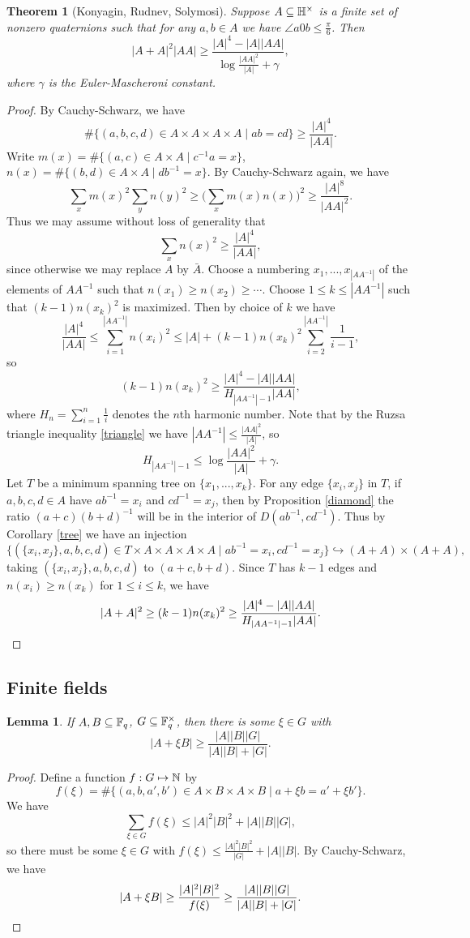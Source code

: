 \documentclass[letterpaper,11pt]{article}
\newtheorem{thm}{Theorem}
\newtheorem{lem}{Lemma}
\theoremstyle{definition}
\theoremstyle{remark}
\begin{document}
\begin{thm}[Konyagin, Rudnev, Solymosi] Suppose $A \subseteq\mathbb{H}^\times$ is a finite set of nonzero quaternions such that for any $a,b \in A$ we have $\angle a0b \le \frac{\pi}{6}$. Then
\[
|A+A|^2|AA| \ge \frac{|A|^4-|A||AA|}{\log\frac{|AA|^2}{|A|}+\gamma},
\]
where $\gamma$ is the Euler-Mascheroni constant.
\end{thm}
\begin{proof} By Cauchy-Schwarz, we have
\[
\#\{(a,b,c,d)\in A\times A\times A\times A\mid ab = cd\} \ge \frac{|A|^4}{|AA|}.
\]
Write $m(x) = \#\{(a,c) \in A\times A\mid c^{-1}a = x\}$, $n(x) = \#\{(b,d) \in A\times A\mid db^{-1} = x\}$. By Cauchy-Schwarz again, we have
\[
\sum_x m(x)^2\sum_y n(y)^2 \ge \Big(\sum_x m(x)n(x)\Big)^2 \ge \frac{|A|^8}{|AA|^2}.
\]
Thus we may assume without loss of generality that
\[
\sum_x n(x)^2 \ge \frac{|A|^4}{|AA|},
\]
since otherwise we may replace $A$ by $\bar{A}$. Choose a numbering $x_1, ..., x_{|AA^{-1}|}$ of the elements of $AA^{-1}$ such that $n(x_1) \ge n(x_2) \ge \cdots$. Choose $1 \le k \le |AA^{-1}|$ such that $(k-1)n(x_k)^2$ is maximized. Then by choice of $k$ we have
\[
\frac{|A|^4}{|AA|} \le \sum_{i=1}^{|AA^{-1}|} n(x_i)^2 \le |A| + (k-1)n(x_k)^2\sum_{i=2}^{|AA^{-1}|} \frac{1}{i-1},
\]
so
\[
(k-1)n(x_k)^2 \ge \frac{|A|^4-|A||AA|}{H_{|AA^{-1}|-1}|AA|},
\]
where $H_n = \sum_{i=1}^n \frac{1}{i}$ denotes the $n$th harmonic number. Note that by the Ruzsa triangle inequality \ref{triangle} we have $|AA^{-1}| \le \frac{|AA|^2}{|A|}$, so
\[
H_{|AA^{-1}|-1} \le \log\frac{|AA|^2}{|A|}+\gamma.
\]
Let $T$ be a minimum spanning tree on $\{x_1, ..., x_k\}$. For any edge $\{x_i,x_j\}$ in $T$, if $a,b,c,d \in A$ have $ab^{-1} = x_i$ and $cd^{-1} = x_j$, then by Proposition \ref{diamond} the ratio $(a+c)(b+d)^{-1}$ will be in the interior of $D(ab^{-1},cd^{-1})$. Thus by Corollary \ref{tree} we have an injection
\[
\{(\{x_i,x_j\},a,b,c,d)\in T\times A\times A\times A\times A\mid ab^{-1}=x_i, cd^{-1}=x_j\} \hookrightarrow (A+A)\times (A+A),
\]
taking $(\{x_i,x_j\},a,b,c,d)$ to $(a+c,b+d)$. Since $T$ has $k-1$ edges and $n(x_i) \ge n(x_k)$ for $1 \le i \le k$, we have
\[
|A+A|^2 \ge (k-1)n(x_k)^2 \ge \frac{|A|^4-|A||AA|}{H_{|AA^{-1}|-1}|AA|}.\qedhere
\]
\end{proof}

\subsection{Finite fields}

\begin{lem}\label{xi} If $A,B \subseteq \mathbb{F}_q$, $G \subseteq \mathbb{F}_q^\times$, then there is some $\xi \in G$ with
\[
|A+\xi B| \ge \frac{|A||B||G|}{|A||B|+|G|}.
\]
\end{lem}
\begin{proof} Define a function $f:G\mapsto \mathbb{N}$ by
\[
f(\xi) = \#\{(a,b,a',b')\in A\times B\times A\times B\mid a+\xi b = a'+\xi b'\}.
\]
We have
\[
\sum_{\xi \in G} f(\xi) \le |A|^2|B|^2 + |A||B||G|,
\]
so there must be some $\xi \in G$ with $f(\xi) \le \frac{|A|^2|B|^2}{|G|} + |A||B|$. By Cauchy-Schwarz, we have
\[
|A+\xi B| \ge \frac{|A|^2|B|^2}{f(\xi)} \ge \frac{|A||B||G|}{|A||B|+|G|}.\qedhere
\]
\end{proof}
\end{document}
